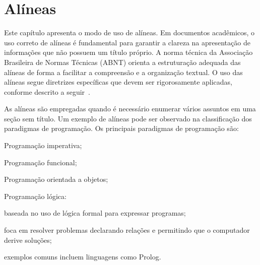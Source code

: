 \documentclass[
    12pt
    ,oneside
    ,a4paper
    ,chapter=TITLE
    ,section=TITLE
    ,sumario=abnt-6027-2012]{abntex2}
\begin{document}



\chapter{Alíneas}
\label{cap:alineas}

Este capítulo apresenta o modo de uso de alíneas. Em documentos acadêmicos, o uso correto de alíneas é fundamental para garantir a clareza na apresentação de informações que não possuem um título próprio. A norma técnica da Associação Brasileira de Normas Técnicas (ABNT) orienta a estruturação adequada das alíneas de forma a facilitar a compreensão e a organização textual. O uso das alíneas segue diretrizes específicas que devem ser rigorosamente aplicadas, conforme descrito a seguir~\cite{abnt2012}.

As alíneas são empregadas quando é necessário enumerar vários assuntos em uma seção sem título. Um exemplo de alíneas pode ser observado na classificação dos paradigmas de programação. Os principais paradigmas de programação são:

\begin{alineas}
    \item Programação imperativa;
    \item Programação funcional;
    \item Programação orientada a objetos;
    \item Programação lógica:
        \begin{subalineas}
            \item baseada no uso de lógica formal para expressar programas;
            \item foca em resolver problemas declarando relações e permitindo que o computador derive soluções;
            \item exemplos comuns incluem linguagens como Prolog.
        \end{subalineas}
\end{alineas}
\end{document}
